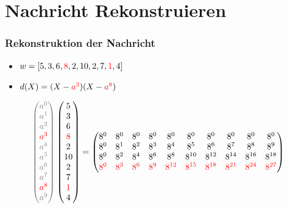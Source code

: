 \documentclass[11pt,aspectratio=169]{beamer}
\begin{document}
\section{Nachricht Rekonstruieren}	
	\begin{frame}
		\frametitle{Rekonstruktion der Nachricht}
		
		\begin{itemize}
			
			\item $w = [5,3,6,\textcolor{red}{8},2,10,2,7,\textcolor{red}{1},4]$
			
			\item $d(X) = (X-\textcolor{red}{a^3})(X-\textcolor{red}{a^8})$
			
		\end{itemize}
	
		\[
		\textcolor{gray}{
		\begin{pmatrix}
			 a^0 \\ a^1 \\ a^2 \\ \textcolor{red}{a^3} \\ a^4 \\ a^5 \\ a^6 \\ a^7 \\ \textcolor{red}{a^8} \\ a^9 \\
		\end{pmatrix}}
		\begin{pmatrix}
			5 \\ 3 \\ 6 \\ \textcolor{red}{8} \\ 2 \\ 10 \\ 2 \\ 7 \\ \textcolor{red}{1} \\ 4 \\
		\end{pmatrix}
		=
		\begin{pmatrix}
			8^0&    8^0&    8^0&    8^0&    8^0&    8^0&    8^0&    8^0&    8^0&    8^0\\
			8^0&	8^1&	8^2&	8^3&	8^4&	8^5&	8^6&	8^7&    8^8&	8^9\\
			8^0&	8^2&	8^4&	8^6&	8^8& 8^{10}& 8^{12}& 8^{14}& 8^{16}& 8^{18}\\
			\textcolor{red}{8^0}&	\textcolor{red}{8^3}&	\textcolor{red}{8^6}&	\textcolor{red}{8^9}& \textcolor{red}{8^{12}}& \textcolor{red}{8^{15}}& \textcolor{red}{8^{18}}& \textcolor{red}{8^{21}}& \textcolor{red}{8^{24}}& \textcolor{red}{8^{27}}\\

\end{pmatrix}\]
\end{frame}
\end{document}
